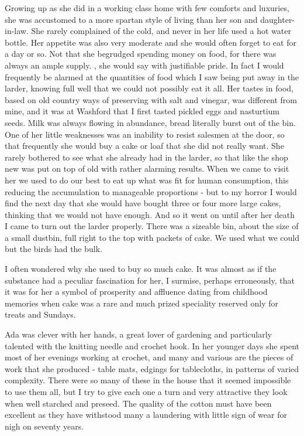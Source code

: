Growing up as she did in a working class home with few comforts and luxuries, she was accustomed to a more spartan style of living than her son and daughter-in-law. She rarely complained of the cold, and never in her life used a hot water bottle. Her appetite was also very moderate and she would often forget to eat for a day or so. Not that she begrudged spending money on food, for there was always an ample supply. , she would say with justifiable pride. In fact I would frequently be alarmed at the quantities of food which I saw being put away in the larder, knowing full well that we could not possibly eat it all. Her tastes in food, based on old country ways of preserving with salt and vinegar, was different from mine, and it was at Washford that I first tasted pickled eggs and nasturtium seeds. Milk was always flowing in abundance, bread literally burst out of the bin. One of her little weaknesses was an inability to resist salesmen at the door, so that frequently she would buy a cake or loaf that she did not really want. She rarely bothered to see what she already had in the larder, so that like the shop new was put on top of old with rather alarming results. When we came to visit her we used to do our best to eat up what was fit for human consumption, this reducing the accumulation to manageable proportions - but to my horror I would find the next day that she would have bought three or four more large cakes, thinking that we would not have enough. And so it went on until after her death I came to turn out the larder properly. There was a sizeable bin, about the size of a small dustbin, full right to the top with packets of cake. We used what we could but the birds had the bulk.

I often wondered why she used to buy so much cake. It was almost as if the substance had a peculiar fascination for her, I surmise, perhaps erroneously, that it was for her a symbol of prosperity and affluence dating from childhood memories when cake was a rare and much prized speciality reserved only for treats and Sundays.

Ada was clever with her hands, a great lover of gardening and particularly talented with the knitting needle and crochet hook. In her younger days she spent most of her evenings working at crochet, and many and various are the pieces of work that she produced - table mats, edgings for tablecloths, in patterns of varied complexity. There were so many of these in the house that it seemed impossible to use them all, but I try to give each one a turn and very attractive they look when well starched and preseed. The quality of the cotton must have been excellent as they have withstood many a laundering with little sign of wear for nigh on seventy years.


